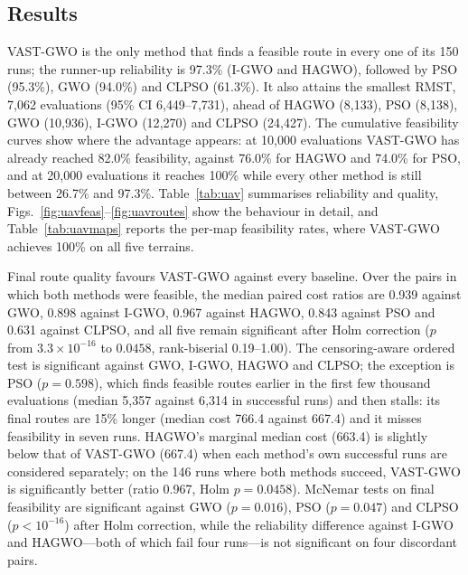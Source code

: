\documentclass[11pt,a4paper]{article}
\newcommand{\method}{VAST-GWO}
\begin{document}
\subsection{Results}
\method{} is the only method that finds a feasible route in every one of its
150 runs; the runner-up reliability is 97.3\% (I-GWO and HAGWO), followed by
PSO (95.3\%), GWO (94.0\%) and CLPSO (61.3\%). It also attains the smallest
RMST, 7{,}062 evaluations (95\% CI 6{,}449--7{,}731), ahead of HAGWO (8{,}133),
PSO (8{,}138), GWO (10{,}936), I-GWO (12{,}270) and CLPSO (24{,}427). The
cumulative feasibility curves show where the advantage appears: at 10{,}000
evaluations \method{} has already reached 82.0\% feasibility, against 76.0\%
for HAGWO and 74.0\% for PSO, and at 20{,}000 evaluations it reaches 100\%
while every other method is still between 26.7\% and 97.3\%. Table~\ref{tab:uav}
summarises reliability and quality, Figs.~\ref{fig:uavfeas}--\ref{fig:uavroutes}
show the behaviour in detail, and Table~\ref{tab:uavmaps} reports the per-map
feasibility rates, where \method{} achieves 100\% on all five terrains.

Final route quality favours \method{} against every baseline. Over the pairs
in which both methods were feasible, the median paired cost ratios are 0.939
against GWO, 0.898 against I-GWO, 0.967 against HAGWO, 0.843 against PSO and
0.631 against CLPSO, and all five remain significant after Holm correction
($p$ from $3.3\times10^{-16}$ to $0.0458$, rank-biserial 0.19--1.00). The
censoring-aware ordered test is significant against GWO, I-GWO, HAGWO and
CLPSO; the exception is PSO ($p=0.598$), which finds feasible routes earlier
in the first few thousand evaluations (median 5{,}357 against 6{,}314 in
successful runs) and then stalls: its final routes are 15\% longer (median cost 766.4 against 667.4) and it misses feasibility in seven runs. HAGWO's
marginal median cost (663.4) is slightly below that of \method{} (667.4) when
each method's own successful runs are considered separately; on the 146 runs
where both methods succeed, \method{} is significantly better (ratio 0.967,
Holm $p=0.0458$). McNemar tests on final feasibility are significant against
GWO ($p=0.016$), PSO ($p=0.047$) and CLPSO ($p<10^{-16}$) after Holm
correction, while the reliability difference against I-GWO and HAGWO---both of
which fail four runs---is not significant on four discordant pairs.

\begin{table}[t]
\centering
\small
\caption{3D UAV delivery application (150 runs per method: five maps, 30
repetitions). Feasibility is the share of runs that found a feasible route
within 30{,}000 evaluations; RMST is the restricted mean time to first
feasibility under a 30{,}000-evaluation censoring horizon, so all runs enter
the statistic; the first-feasible median is conditional on successful runs and
is shown for reference; cost is the median final route cost over feasible runs
(lower is better).}
\label{tab:uav}
\resizebox{\linewidth}{!}{}
\end{table}
\end{document}
